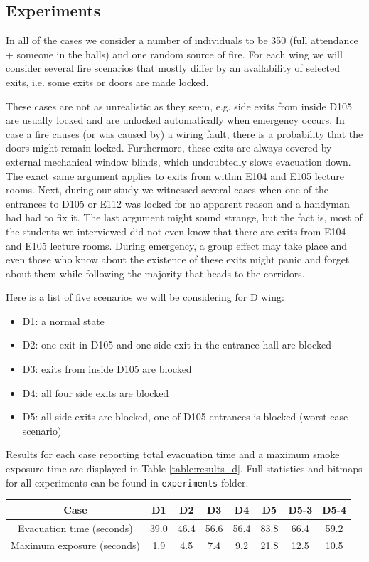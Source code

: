 \subsection{Experiments}
In all of the cases we consider a number of individuals to be 350 (full
attendance + someone in the halls) and one random source of fire. For each wing
we will consider several fire scenarios that mostly differ by an availability
of selected exits, i.e. some exits or doors are made locked.

These cases are not as unrealistic as they seem, e.g. side exits from inside
D105 are usually locked and are unlocked automatically when emergency occurs.
In case a fire causes (or was caused by) a wiring fault, there is a probability
that the doors might remain locked.
Furthermore, these exits are always covered by external mechanical window blinds,
which undoubtedly slows evacuation down.
The exact same argument applies to exits from within E104 and E105 lecture
rooms.
Next, during our study we witnessed several cases when one of the entrances
to D105 or E112 was locked for no apparent reason and a handyman had had to fix
it.
The last argument might sound strange, but the fact is, most of the students we
interviewed did not even know that there are exits from E104 and E105 lecture
rooms.
During emergency, a group effect may take place and even those who know about
the existence of these exits might panic and forget about them while following
the majority that heads to the corridors.

Here is a list of five scenarios we will be considering for D wing:

\begin{itemize}
    \item D1: a normal state
    \item D2: one exit in D105 and one side exit in the entrance hall are
    blocked
    \item D3: exits from inside D105 are blocked
    \item D4: all four side exits are blocked
    \item D5: all side exits are blocked, one of D105 entrances is blocked
    (worst-case scenario)
\end{itemize}

Results for each case reporting total evacuation time and a maximum smoke
exposure time are displayed in Table \ref{table:results_d}.
Full statistics and bitmaps for all experiments can be found in
\texttt{experiments} folder.

\begin{center}
    \label{table:results_d}
    \begin{tabular}{ c | c | c | c | c | c | c | c }
        \hline
        Case & D1 & D2 & D3 & D4 & D5 & D5-3 & D5-4 \\
        \hline
        Evacuation time (seconds) & 39.0 & 46.4 & 56.6 & 56.4 & 83.8 & 66.4 & 59.2 \\
        Maximum exposure (seconds) & 1.9 & 4.5 & 7.4 & 9.2 & 21.8 & 12.5 & 10.5 \\
        \hline
    \end{tabular}
\end{center}

